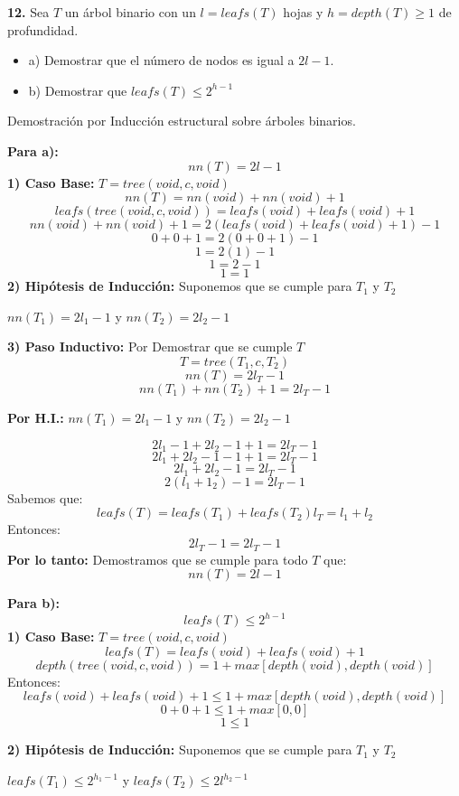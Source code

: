 \textbf{12.} Sea $T$ un árbol binario con un $l = leafs(T)$ hojas y $h = depth(T) \geq 1$ de profundidad.
\begin{itemize}
    \item a) Demostrar que el número de nodos es igual a $2l -1$.
    \item b) Demostrar que $leafs(T) \leq 2^{h -1}$
\end{itemize}



Demostración por Inducción estructural sobre árboles binarios.
\newline

\textbf{Para a):}
\[
nn(T) = 2l - 1
\]
\textbf{1) Caso Base:} $T = tree(void, c , void)$
\[
nn(T) = nn(void) + nn(void) +1
\]
\[
leafs (tree(void, c , void)) = leafs(void) + leafs(void) + 1
\]
\[
nn(void) + nn(void) +1 = 2(leafs(void) + leafs(void) + 1) - 1
\]
\[
0 + 0 +1 = 2(0 + 0 + 1) - 1
\]
\[
1 = 2(1) - 1
\]
\[
1 = 2 - 1
\]
\[
1 = 1
\]
\textbf{2) Hipótesis de Inducción:} Suponemos que se cumple para $T_{1}$ y $T_{2}$
\begin{center}
    $nn(T_{1}) = 2l_{1} -1$   y     $nn(T_{2}) = 2l_{2} -1$ 
\end{center}

\textbf{3) Paso Inductivo:} Por Demostrar que se cumple  $T$
\[
T = tree(T_{1}, c , T_{2})
\]
\[
nn(T) = 2l_{T} -1
\]
\[
nn(T_{1}) + nn(T_{2}) + 1 = 2l_{T} -1
\]
\begin{center}
    \textbf{Por H.I.:} $nn(T_{1}) = 2l_{1} -1$   y     $nn(T_{2}) = 2l_{2} -1$ 
\end{center}
\[
2l_{1} -1 + 2l_{2} -1 + 1 = 2l_{T} -1
\]
\[
2l_{1} + 2l_{2} -1 -1 + 1 = 2l_{T} -1
\]
\[
2l_{1} + 2l_{2} -1  = 2l_{T} -1
\]
\[
2(l_{1} + 1_{2}) -1  = 2l_{T} -1
\]
Sabemos que: \\
\[
leafs(T) = leafs(T_{1}) + leafs(T_{2})
l_{T} = l_{1} + l_{2}
\]
Entonces: \\
\[
2l_{T} -1 = 2l_{T} -1
\]
\textbf{Por lo tanto:} Demostramos que se cumple para todo $T$ que:
\[
nn(T) = 2l - 1
\]

\newpage 
\textbf{Para b):}
\[
leafs(T) \leq 2^{h -1}
\]
\textbf{1) Caso Base:} $T = tree(void, c , void)$
\[
leafs(T) = leafs(void) + leafs(void) + 1 
\]
\[
depth(tree( void, c, void)) = 1 + max [depth(void), depth(void)]
\]
Entonces:
\[
leafs(void) + leafs(void) + 1 \leq 1 + max [depth(void), depth(void)]
\]
\[
0 + 0 + 1 \leq 1 + max [0, 0]
\]
\[
 1 \leq 1 
\]

\textbf{2) Hipótesis de Inducción:} Suponemos que se cumple para $T_{1}$ y $T_{2}$
\begin{center}
    $leafs(T_{1}) \leq 2^{h_{1}-1}$    y     $leafs(T_{2}) \leq 2l^{h_{2}-1}$ 
\end{center}


